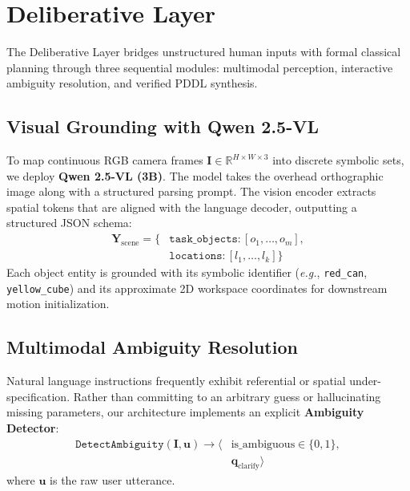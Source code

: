 \documentclass[conference]{IEEEtran}
\begin{document}
\section{Deliberative Layer}
\label{sec:deliberative_layer}

The Deliberative Layer bridges unstructured human inputs with formal classical planning through three sequential modules: multimodal perception, interactive ambiguity resolution, and verified PDDL synthesis.

\subsection{Visual Grounding with Qwen 2.5-VL}
To map continuous RGB camera frames $\mathbf{I} \in \mathbb{R}^{H\times W\times 3}$ into discrete symbolic sets, we deploy \textbf{Qwen 2.5-VL (3B)}. The model takes the overhead orthographic image along with a structured parsing prompt. The vision encoder extracts spatial tokens that are aligned with the language decoder, outputting a structured JSON schema:
\begin{align}
    \mathbf{Y}_{\text{scene}} = \big\{ & \texttt{task\_objects}: [o_1, \dots, o_m], \nonumber \\
    & \texttt{locations}: [l_1, \dots, l_k] \big\}
\end{align}
Each object entity is grounded with its symbolic identifier (\textit{e.g.}, \texttt{red\_can}, \texttt{yellow\_cube}) and its approximate 2D workspace coordinates for downstream motion initialization.

\subsection{Multimodal Ambiguity Resolution}
Natural language instructions frequently exhibit referential or spatial under-specification. Rather than committing to an arbitrary guess or hallucinating missing parameters, our architecture implements an explicit \textbf{Ambiguity Detector}:
\begin{align}
    \texttt{DetectAmbiguity}(\mathbf{I}, \mathbf{u}) \to \big\langle & \text{is\_ambiguous} \in \{0, 1\}, \nonumber \\
    & \mathbf{q}_{\text{clarify}} \big\rangle
\end{align}
where $\mathbf{u}$ is the raw user utterance.
\end{document}
